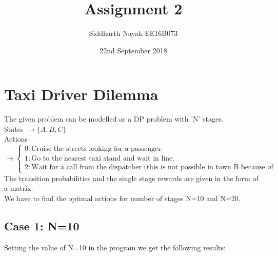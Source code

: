 \documentclass{article}
\title{Assignment 2}
\date{22nd September 2018}
\author{Siddharth Nayak EE16B073}
\begin{document}
\maketitle


\section{Taxi Driver Dilemma}
The given problem can be modelled as a DP problem with 'N' stages.\\
States $\rightarrow \{A,B,C\}$\\
Actions $\rightarrow 
\begin{cases}
0:\textrm{Cruise the streets looking for a passenger.}\\
1:\textrm{Go to the nearest taxi stand and wait in line.}\\
2:\textrm{Wait for a call from the dispatcher (this is not possible in town B because of poor reception).}
\end{cases}
$\\
The transition probabilities and the single stage rewards are given in the form of a matrix.\\
We have to find the optimal actions for number of stages N=10 and N=20.\\

\subsection{Case 1: N=10}
Setting the value of N=10 in the program we get the following results:\\
\end{document}
